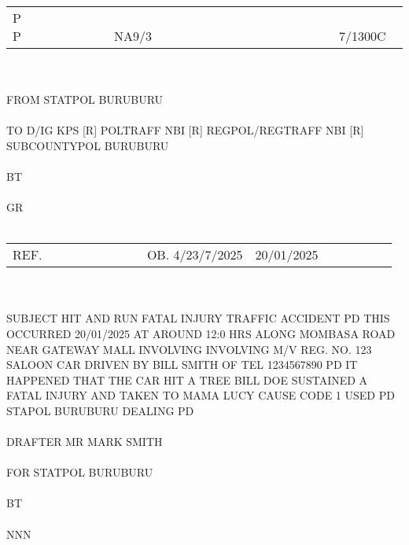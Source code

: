 \documentclass{article}\usepackage[]{graphicx}\usepackage[]{xcolor}
\begin{document}
\pagestyle{empty}





\noindent \\
\begin{tabular}{@{}lcr} %
P    P & ~~~~~~~~~~~~~~~~~~~~~~~ NA9/3 & ~~~~~~~~~~~~~~~~~~ 7/1300C ~ \\
\end{tabular}
\\
\\
FROM STATPOL BURUBURU  \\
\\
TO D/IG KPS [R] POLTRAFF NBI [R] REGPOL/REGTRAFF NBI [R] SUBCOUNTYPOL BURUBURU \\
\\
BT \\
\\
GR  \\
\\
\begin{tabularx}{\textwidth}{@{}lXr} %
REF. & ~~~~~~~~~~~~~~ OB. 4/23/7/2025 & 20/01/2025 ~~~~~~~~~~ \\
\end{tabularx}
\\
\\
SUBJECT HIT AND RUN FATAL INJURY TRAFFIC ACCIDENT PD THIS OCCURRED 20/01/2025 AT AROUND 12:0  HRS ALONG MOMBASA ROAD NEAR GATEWAY MALL INVOLVING INVOLVING M/V REG. NO. 123 SALOON CAR DRIVEN BY BILL SMITH OF TEL 1234567890 PD IT HAPPENED THAT THE CAR HIT A TREE  BILL DOE SUSTAINED A FATAL INJURY AND TAKEN TO MAMA LUCY  CAUSE CODE 1 USED PD STAPOL BURUBURU DEALING PD \\
\\
DRAFTER MR MARK SMITH \\
\\
FOR STATPOL BURUBURU \\
\\
BT  \\
\\
NNN  \\

\newpage
\end{document}
